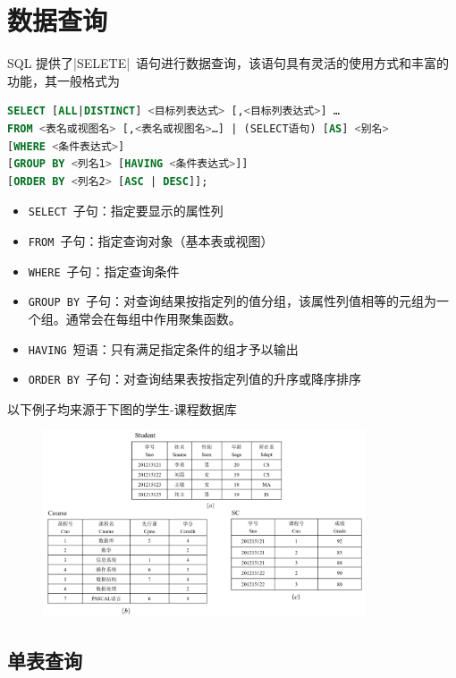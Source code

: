\section{数据查询}
SQL 提供了\sverb|SELETE|\ 语句进行数据查询，该语句具有灵活的使用方式和丰富的功能，其一般格式为
\begin{lstlisting}[language=sql]
SELECT [ALL|DISTINCT] <目标列表达式> [,<目标列表达式>] …
FROM <表名或视图名> [,<表名或视图名>…] | (SELECT语句) [AS] <别名>
[WHERE <条件表达式>]
[GROUP BY <列名1> [HAVING <条件表达式>]]
[ORDER BY <列名2> [ASC | DESC]];
\end{lstlisting}
\begin{itemize}
    \item \verb|SELECT|\ 子句：指定要显示的属性列
    \item \verb|FROM|\ 子句：指定查询对象（基本表或视图）
    \item \verb|WHERE|\ 子句：指定查询条件
    \item \verb|GROUP BY|\ 子句：对查询结果按指定列的值分组，该属性列值相等的元组为一个组。通常会在每组中作用聚集函数。
    \item \verb|HAVING|\ 短语：只有满足指定条件的组才予以输出
    \item \verb|ORDER BY|\ 子句：对查询结果表按指定列值的升序或降序排序 
\end{itemize}

以下例子均来源于下图的学生-课程数据库
\begin{figure}[H]
    \vspace{-0.5em}
    \centering
    \includegraphics[width=0.85\textwidth]{images/2.3.2}
    \vspace{-1em}
\end{figure}

\subsection{单表查询}

